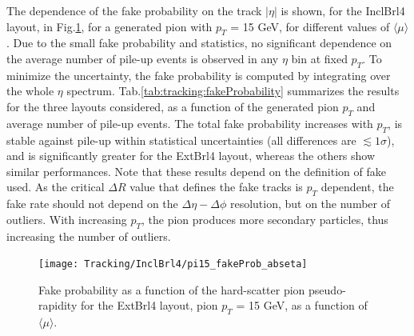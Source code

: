 \documentclass[a4paper,twoside,12pt]{book}
\begin{document}
The dependence of the fake probability on the track $|\eta|$ is shown, for the InclBrl4 layout, in Fig.\ref{fig:tracking:fakeProbability}, for a generated pion with $p_{T}$ = 15 GeV, for 
different values of $\langle\mu\rangle$. Due to the small fake probability and statistics, no significant dependence on the average number of pile-up events is observed in any $\eta$ bin at fixed $p_{T}$. To minimize
the uncertainty, the fake probability is computed by integrating over the whole $\eta$ spectrum. Tab.\ref{tab:tracking:fakeProbability} summarizes the results for the three layouts considered, as a function of the generated pion $p_{T}$ and average number of pile-up events. The total fake probability increases with $p_{T}$, is stable against pile-up within
statistical uncertainties (all differences are $\lesssim 1 \sigma$), and is significantly
greater for the ExtBrl4 layout, whereas the others show similar performances. Note that 
these results depend on the definition of fake used. As the critical $\Delta R$ value that defines
the fake tracks is $p_{T}$ dependent, the fake rate should not depend on the $\Delta\eta-\Delta\phi$ resolution, but on the number of outliers. With increasing $p_{T}$, 
the pion produces more secondary particles, thus increasing the number of outliers.\\ 

\begin{figure}
\centering
\texttt{[image: Tracking/InclBrl4/pi15\_fakeProb\_abseta]}
\caption{Fake probability as a function of the hard-scatter pion pseudo-rapidity for the ExtBrl4 layout, pion $p_{T}$ = 15 GeV, as a function of $\langle\mu\rangle$.} 
\label{fig:tracking:fakeProbability}
\end{figure}
\end{document}
